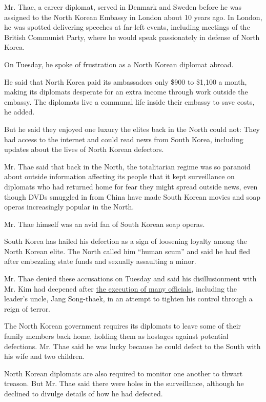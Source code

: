 Mr. Thae, a career diplomat, served in Denmark and Sweden before he was
assigned to the North Korean Embassy in London about 10 years ago. In
London, he was spotted delivering speeches at far-left events, including
meetings of the British Communist Party, where he would speak
passionately in defense of North Korea.

On Tuesday, he spoke of frustration as a North Korean diplomat abroad.

He said that North Korea paid its ambassadors only \$900 to \$1,100 a
month, making its diplomats desperate for an extra income through work
outside the embassy. The diplomats live a communal life inside their
embassy to save costs, he added.

But he said they enjoyed one luxury the elites back in the North could
not: They had access to the internet and could read news from South
Korea, including updates about the lives of North Korean defectors.

Mr. Thae said that back in the North, the totalitarian regime was so
paranoid about outside information affecting its people that it kept
surveillance on diplomats who had returned home for fear they might
spread outside news, even though DVDs smuggled in from China have made
South Korean movies and soap operas increasingly popular in the North.

Mr. Thae himself was an avid fan of South Korean soap operas.

South Korea has hailed his defection as a sign of loosening loyalty
among the North Korean elite. The North called him ``human scum'' and
said he had fled after embezzling state funds and sexually assaulting a
minor.

Mr. Thae denied these accusations on Tuesday and said his
disillusionment with Mr. Kim had deepened after
\href{http://www.nytimes3xbfgragh.onion/2013/12/14/world/asia/execution-raises-doubts-about-kims-grip-on-north-korea.html}{the
execution of many officials}, including the leader's uncle, Jang
Song-thaek, in an attempt to tighten his control through a reign of
terror.

The North Korean government requires its diplomats to leave some of
their family members back home, holding them as hostages against
potential defections. Mr. Thae said he was lucky because he could defect
to the South with his wife and two children.

North Korean diplomats are also required to monitor one another to
thwart treason. But Mr. Thae said there were holes in the surveillance,
although he declined to divulge details of how he had defected.

